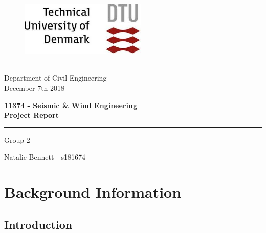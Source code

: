 \documentclass[11pt,a4paper,titlepage]{report}
\begin{document}

\begin{titlepage}
\begin{center}
\begin{figure}
    \centering
        \includegraphics[width=6cm]{logo_dtu.jpg}
\end{figure}
\ \\ 
Department of Civil Engineering\\
December 7th 2018\\
\end{center}
\begin{flushleft}
\vspace{3cm}
\begin{center}
\Huge
\textbf{11374 - Seismic \& Wind Engineering}\\
\textbf{Project Report}\\
\end{center}
\rule[0.5ex]{\textwidth}{0.1mm}
\end{flushleft}
\begin{flushleft}
\begin{center}
\LARGE{Group 2}
\end{center}

\end{flushleft}
\vfill

\begin{flushleft}
\begin{center}
\textnormal{Natalie Bennett - s181674}\\
\end{center}
\end{flushleft}

\end{titlepage}


\newpage
 \tableofcontents
\thispagestyle{empty}

\newpage
\setcounter{page}{1}

\chapter{Background Information}
\section{Introduction}
\end{document}
